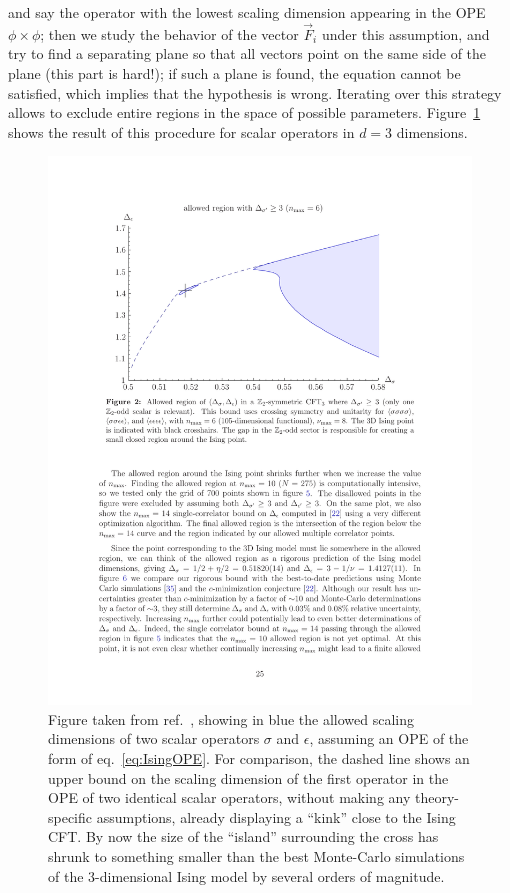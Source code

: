 \documentclass[a4paper,12pt]{article}
\numberwithin{equation}{section}
\begin{document}
%
and say the operator with the lowest scaling dimension appearing in the OPE $\phi \times \phi$; then we study the behavior of the vector $\vec{F}_i$ under this assumption, and try to find a separating plane so that all vectors point on the same side of the plane
(this part is hard!); if such a plane is found, the equation cannot be satisfied, which implies that the hypothesis is wrong.
Iterating over this strategy allows to exclude entire regions in the space of possible parameters. Figure~\ref{fig:Ising:island} shows the result of this procedure for scalar operators in $d = 3$ dimensions. 
\begin{figure}
	\centering
	\includegraphics[width=0.8\linewidth]{figures/IsingIsland.pdf}
	\caption{Figure taken from ref.~\cite{Kos:2014bka}, showing
	in blue the allowed scaling dimensions of two scalar operators
	$\sigma$ and $\epsilon$,
	assuming an OPE of the form of eq.~\eqref{eq:IsingOPE}.
	For comparison, the dashed line shows an upper bound on the
	scaling dimension of the first operator in the OPE of
	two identical scalar operators, without making any 
	theory-specific assumptions, already displaying a ``kink''
	close to the Ising CFT.
	By now the size of the ``island'' surrounding the cross
	has shrunk to something smaller than the best Monte-Carlo
	simulations of the 3-dimensional Ising model by several
	orders of magnitude.}
	\label{fig:Ising:island}
\end{figure}
\end{document}
